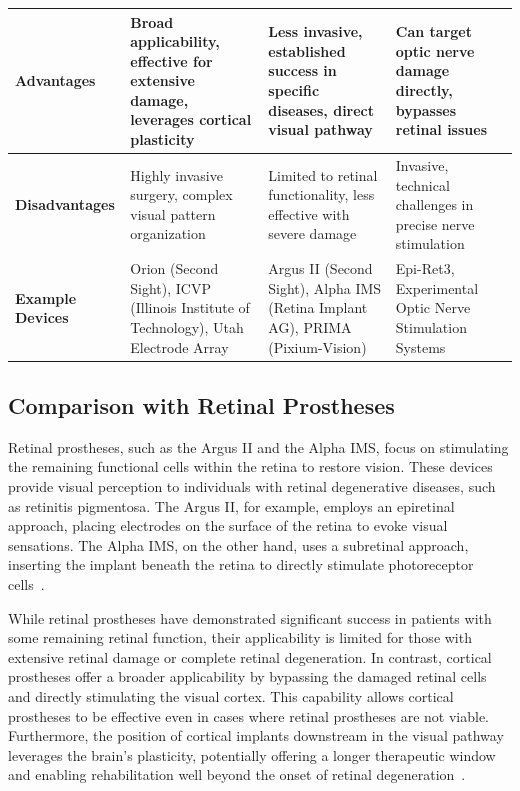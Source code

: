 \documentclass[twocolumn,10pt]{article}
\begin{document}
\begin{table}[ht!]
\begin{tabularx}{\textwidth}{X X X X}
            \textbf{Advantages}                          & Broad applicability, effective for extensive damage, leverages cortical plasticity  & Less invasive, established success in specific diseases, direct visual pathway & Can target optic nerve damage directly, bypasses retinal issues \\ \hline
            \textbf{Disadvantages}                       & Highly invasive
            surgery, complex visual pattern organization &
            Limited to retinal functionality, less effective with severe damage
                                                         & Invasive, technical challenges in precise nerve stimulation                                                                                                                                                                            \\
            \hline
            \textbf{Example Devices}                     & Orion (Second Sight), ICVP (Illinois Institute of Technology), Utah Electrode Array & Argus II (Second Sight), Alpha IMS (Retina Implant AG), PRIMA (Pixium-Vision)  & Epi-Ret3, Experimental Optic Nerve Stimulation Systems          \\ \hline
      \end{tabularx}
\end{table}

\subsection*{Comparison with Retinal Prostheses}
Retinal prostheses, such as the Argus II and the Alpha IMS, focus on stimulating the remaining functional cells within the retina to restore vision. These devices provide visual perception to individuals with retinal degenerative diseases, such as retinitis pigmentosa. The Argus II, for example, employs an epiretinal approach, placing electrodes on the surface of the retina to evoke visual sensations. The Alpha IMS, on the other hand, uses a subretinal approach, inserting the implant beneath the retina to directly stimulate photoreceptor cells~\parencite{stinglArtificialVisionWirelessly2013}.

While retinal prostheses have demonstrated significant success in patients with some remaining retinal function, their applicability is limited for those with extensive retinal damage or complete retinal degeneration. In contrast, cortical prostheses offer a broader applicability by bypassing the damaged retinal cells and directly stimulating the visual cortex. This capability allows cortical prostheses to be effective even in cases where retinal prostheses are not viable. Furthermore, the position of cortical implants downstream in the visual pathway leverages the brain's plasticity, potentially offering a longer therapeutic window and enabling rehabilitation well beyond the onset of retinal degeneration~\parencite{tzekovGabelEdArtificial2020}.
\end{document}

